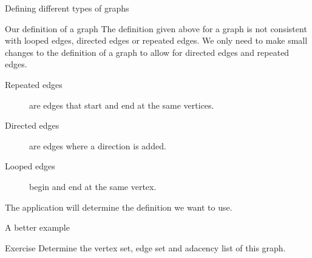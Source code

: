 \begin{frame}{Defining different types of graphs}
	
	\begin{block}{Our definition of a graph}
	The definition given above for a graph is not consistent with looped edges, directed edges or repeated edges. We only need to make small changes to the definition of a graph to allow for directed edges and repeated edges.
	\end{block}
	
	\begin{description}
		\item[Repeated edges] are edges that start and end at the same vertices.
		\item[Directed edges] are edges where a direction is added.
		\item[Looped edges] begin and end at the same vertex.
	\end{description}
	
	The application will determine the definition we want to use.
\end{frame}


\begin{frame}{A better example}
  \begin{adjustbox}{max width={0.9\textwidth},center} 
  \end{adjustbox}
  \vspace{0.1cm}
  \begin{block}{Exercise}
	Determine the vertex set, edge set and adacency list of this graph.
  \end{block}
  
\end{frame}


